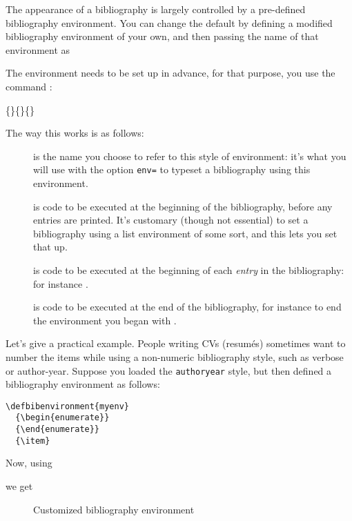 The appearance of a bibliography is largely controlled by a
pre-defined bibliography environment. You can change the default by
defining a modified bibliography environment of your own, and then
passing the name of that environment as
\begin{center}
\end{center}

The environment needs to be set up in advance, for that purpose, you
use the command :
\begin{center}
\ttfamily
{}\{\}\{\}\{\}
\end{center}

The way this works is as follows:
\begin{description}
\item[] is the name you choose to refer to this style of
  environment: it's what you will use with the option \texttt{env=} to
  typeset a bibliography using this environment.
\item[] is code to be executed at the beginning of the
  bibliography, before any entries are printed. It's customary (though
  not essential) to set a bibliography using a list environment of
  some sort, and this lets you set that up.
\item[] is code to be executed at the beginning of each
  \emph{entry} in the bibliography: for instance .
\item[] is code to be executed at the end of the
  bibliography, for instance to end the environment you began with
  .
\end{description}

Let's give a practical example. People writing CVs (resum\'es)
sometimes want to number the items while using a non-numeric
bibliography style, such as verbose or author-year. Suppose you loaded
the \verb|authoryear| style, but then defined a bibliography
environment as follows:
\begin{verbatim}
\defbibenvironment{myenv}
  {\begin{enumerate}}
  {\end{enumerate}}
  {\item}
\end{verbatim}
Now, using
\begin{pseudoverb}
\relax[env=myenv,heading=myheading]
\end{pseudoverb}
we get

\begin{figure}
\caption{Customized bibliography environment\label{custom-env}}
\end{figure}
